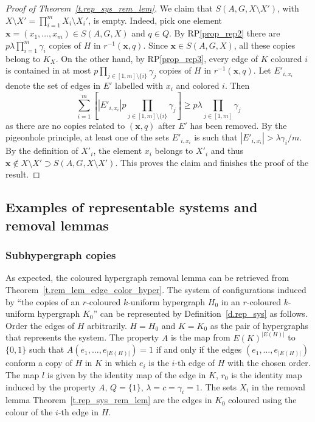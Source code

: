 \documentclass[10pt]{article}
\begin{document}
\begin{proof}[Proof of Theorem~\ref{t.rep_sys_rem_lem}]
	We claim that $S(A,G,X\setminus X')$, with $X\setminus X'=\prod_{i=1}^m X_i\setminus X_i'$, is empty. Indeed, pick one element  $\mathbf{x}=(x_1,\ldots ,x_m)\in S(A,G,X)$ and $q\in Q$. By RP\ref{prop_rep2} there are $p\lambda \prod_{i=1}^m \gamma_i$ copies of $H$ in $r^{-1}(\mathbf{x},q)$. Since  $\mathbf{x}\in S(A,G,X)$, all these copies belong to $K_X$. On the other hand, by RP\ref{prop_rep3}, every edge of $K$ coloured $i$ is contained in at most $p\prod_{j\in[1,m]\setminus \{i\}} \gamma_j$ copies of $H$ in $r^{-1}(\mathbf{x},q)$. Let $E'_{i,x_i}$ denote the set of edges in $E'$ labelled with $x_i$ and colored $i$. Then
	\begin{displaymath}
		\sum_{i=1}^m \left[|E'_{i,x_i}| p\prod_{j\in[1,m]\setminus \{i\}} \gamma_j \right]\geq  p \lambda\prod_{j\in[1,m]} \gamma_j
	\end{displaymath}
as there are no copies related to $(\mathbf{x},q)$ after $E'$ has been removed.
By the pigeonhole principle, at least one of the sets $E'_{i,x_i}$ is such that $|E'_{i,x_i}|>\lambda \gamma_i/m$. By the definition of $X'_i$, the element $x_i$ belongs to $X'_i$ and thus $\mathbf{x}\not\in  X\setminus X' \supset S(A,G,X\setminus X')$. This proves the claim and finishes the proof of the result.
\end{proof}


\subsection{Examples of representable systems and removal lemmas} \label{s.some_rep_syst}

\subsubsection{Subhypergraph copies}

As expected, the coloured hypergraph removal lemma can be retrieved from
Theorem~\ref{t.rem_lem_edge_color_hyper}.
The system of configurations induced by ``the copies of an $r$-coloured $k$-uniform hypergraph $H_0$ in an $r$-coloured $k$-uniform hypergraph $K_0$'' can be represented by Definition~\ref{d.rep_sys} as follows. Order the edges of $H$ arbitrarily. $H=H_0$ and $K=K_0$ as the pair of hypergraphs that represents the system. The property $A$ is the map from $E(K)^{|E(H)|}$ to $\{0,1\}$ such that $A(e_1,\ldots,e_{|E(H)|})=1$ if and only if the edges $(e_1,\ldots,e_{|E(H)|})$ conform a copy of $H$ in $K$
in which $e_i$ is the $i$-th edge of $H$ with the chosen order. The map $l$
is given by the identity map of the edge in $K$, $r_0$ is the identity map induced by the property $A$, $Q=\{1\}$, $\lambda=c=\gamma_i=1$.
The sets $X_i$ in the removal lemma Theorem~\ref{t.rep_sys_rem_lem} are the edges in $K_0$ coloured using the colour of the $i$-th edge in $H$.
\end{document}
